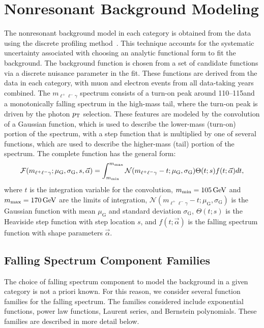 \section{Nonresonant Background Modeling}
The nonresonant background model in each category is obtained from the data using the discrete profiling method~\cite{Dauncey:2014xga}.
This technique accounts for the systematic uncertainty associated with choosing an analytic functional form to fit the background.
The background function is chosen from a set of candidate functions via a discrete nuisance parameter in the fit.
These functions are derived from the data in each category, with muon and electron events from all data-taking years combined.
The $m_{\ell^+\ell^-\gamma}$ spectrum consists of a turn-on peak around 110--115\GeV and a monotonically falling spectrum in the high-mass tail, where the turn-on peak is driven by the photon $p_{\mathrm{T}}$ selection.
These features are modeled by the convolution of a Gaussian function, which is used to describe the lower-mass (turn-on) portion of the spectrum, with a step function that is multiplied by one of several functions, which are used to describe the higher-mass (tail) portion of the spectrum.
The complete function has the general form:
\begin{equation}
    \mathcal{F}(m_{\ell^{+}\ell^{-}\gamma}; \mu_{\mathrm{G}}, \sigma_{\mathrm{G}}, s, \vec{\alpha}) = \int_{m_\textrm{min}}^{m_\textrm{max}}\mathcal{N}(m_{\ell^{+}\ell^{-}\gamma}-t;\mu_{\mathrm{G}},\sigma_{\mathrm{G}})\Theta(t; s)f(t; \vec{\alpha})dt,
\end{equation}
where $t$ is the integration variable for the convolution, $m_\textrm{min}=105\,\text{Ge\hspace{-.08em}V}$ and $m_\textrm{max}=170\,\text{Ge\hspace{-.08em}V}$ are the limits of integration, $\mathcal{N}(m_{\ell^+\ell^-\gamma}-t;\mu_{\mathrm{G}},\sigma_{\mathrm{G}})$ is the Gaussian function with mean $\mu_{\mathrm{G}}$ and standard deviation $\sigma_{\mathrm{G}}$, $\Theta(t; s)$ is the Heaviside step function with step location $s$, and $f(t; \vec{\alpha})$ is the falling spectrum function with shape parameters $\vec{\alpha}$.

\subsection{Falling Spectrum Component Families}
The choice of falling spectrum component to model the background in a given category is not a priori known. For this reason, we consider several function families for the falling spectrum. 
The families considered include exponential functions, power law functions, Laurent series, and Bernstein polynomials.
These families are described in more detail below.

